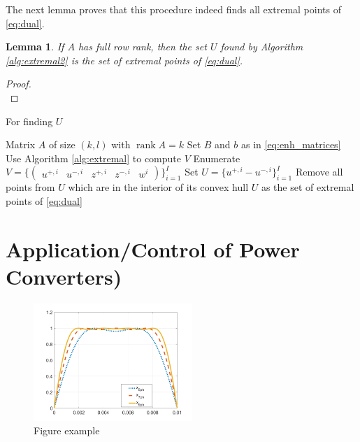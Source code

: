 \documentclass[journal]{IEEEtranTIE}
\newtheorem{lemma}[thm]{Lemma}
\theoremstyle{definition}
\newcommand{\rank}{\operatorname{rank}}
\begin{document}
The next lemma proves that this procedure indeed finds all extremal points of \eqref{eq:dual}.

\begin{lemma}
  If $A$ has full row rank, then the set $U$ found by Algorithm \ref{alg:extremal2} is the set of extremal points of \eqref{eq:dual}.
\end{lemma}
\begin{proof}
\ \\
\end{proof}





\begin{algorithm}
\caption{For finding $U$}
\label{alg:extremal2}
\begin{algorithmic}[1]
  \Require Matrix $A$ of size $(k,l)$ with $\rank A=k$
  \State Set $B$ and $b$ as in \eqref{eq:enh_matrices}
  \State Use Algorithm \ref{alg:extremal} to compute $V$
  \State Enumerate $V = \{\begin{pmatrix} u^{+,i} & u^{-,i} & z^{+,i}& z^{-,i} & w^i \end{pmatrix}\}_{i=1}^I$
  \State Set $U = \{u^{+,i} - u^{-,i}\}_{i=1}^I$
  \State Remove all points from $U$ which are in the interior of its convex hull
  \Ensure $U$ as the set of extremal points of \eqref{eq:dual}
\end{algorithmic}
\end{algorithm}





\section{Application/Control of Power Converters)}

\begin{figure}[!ht]
\centering
\includegraphics[width=6cm]{Figures/optimized_flux_waveform_5_7_9ph}
\caption{Figure example}
\label{fig:optimal-ratio-harmonics}
\end{figure}
\end{document}
